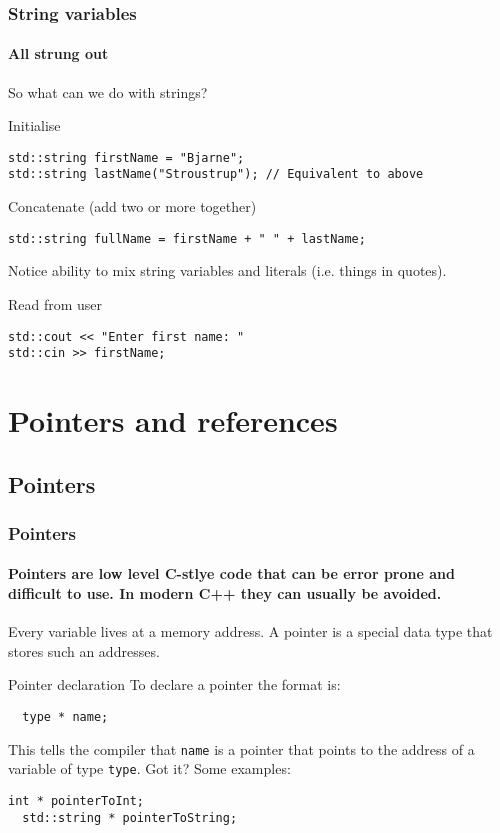 \documentclass{beamer}
\begin{document}
\begin{frame}[fragile]
  \frametitle{String variables}
  \framesubtitle{All strung out}
  So what can we do with strings?
	
  \begin{block}{Initialise}
      \begin{lstlisting}
std::string firstName = "Bjarne";
std::string lastName("Stroustrup"); // Equivalent to above
      \end{lstlisting}
  \end{block}
  \pause
  \begin{block}{Concatenate (add two or more together)}
      \begin{lstlisting}
std::string fullName = firstName + " " + lastName;
      \end{lstlisting}
			Notice ability to mix string variables and literals (i.e. things in quotes).      
  \end{block}
  \pause
  \begin{block}{Read from user}
    \begin{lstlisting}
std::cout << "Enter first name: "
std::cin >> firstName;
    \end{lstlisting}
  \end{block}
\end{frame}

\section{Pointers and references}

\subsection{Pointers}

\begin{frame}[fragile]
  \frametitle{Pointers}
  \framesubtitle{Pointers are low level C-stlye code that can be error prone and difficult to use. In modern C++ they can usually be avoided.}
  Every variable lives at a memory address.  A pointer is a special data type that stores such an addresses.
  \begin{block}{Pointer declaration}
  To declare a pointer the format is:
	  \begin{lstlisting}
  type * name;
	  \end{lstlisting}
	  This tells the compiler that \texttt{name} is a pointer that points to the address of a variable of type \texttt{type}.  Got it?
	  \pause\newline
	  Some examples:
	  \begin{lstlisting}[belowskip=0pt]
  int * pointerToInt;
  std::string * pointerToString;
	  \end{lstlisting}
  \end{block}
\end{frame}
\end{document}
